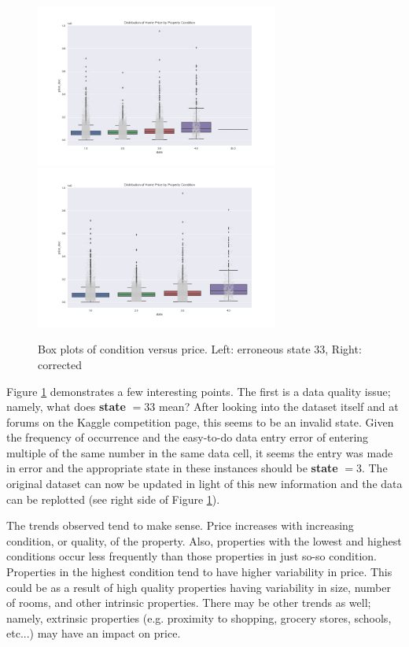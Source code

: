 \documentclass[12pt]{article}
\theoremstyle{plain} %
\theoremstyle{definition} %
\theoremstyle{remark} %
\begin{document}
\begin{figure}[h!]
\begin{center}
\includegraphics[width=8cm]{./output_images/state_box_plot.png}
\includegraphics[width=8cm]{./output_images/state_box_plot_fixed.png}
\caption{Box plots of condition versus price.  Left: erroneous state 33, Right: corrected}
\label{fig:five}
\end{center}
\end{figure}

Figure \ref{fig:five} demonstrates a few interesting points.  The first is a data quality issue; namely, what does \textbf{state} $= 33$ mean?  After looking into the dataset itself and at forums on the Kaggle competition page, this seems to be an invalid state.  Given the frequency of occurrence and the easy-to-do data entry error of entering multiple of the same number in the same data cell, it seems the entry was made in error and the appropriate state in these instances should be \textbf{state} $= 3$.  The original dataset can now be updated in light of this new information and the data can be replotted (see right side of Figure \ref{fig:five}).

\par The trends observed tend to make sense.  Price increases with increasing condition, or quality, of the property.  Also, properties with the lowest and highest conditions occur less frequently than those properties in just so-so condition.  Properties in the highest condition tend to have higher variability in price.  This could be as a result of high quality properties having variability in size, number of rooms, and other intrinsic properties.  There may be other trends as well; namely, extrinsic properties  (e.g. proximity to shopping, grocery stores, schools, etc...) may have an impact on price.
\end{document}
